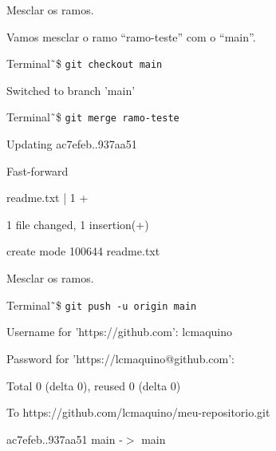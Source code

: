 \documentclass[brazil,aspectratio=169]{beamer}
\newcommand{\terminal}[1]{\textcolor{my-green}{\texttt{#1}}}
\begin{document}
\begin{frame}{Mesclar os ramos.}

  Vamos mesclar o ramo ``ramo-teste'' com o ``main''.

  \begin{exampleblock}{Terminal}
    \~\,\$ \terminal{git checkout main}

    Switched to branch 'main'
  \end{exampleblock}


  \begin{exampleblock}{Terminal}
    \~\,\$ \terminal{git merge ramo-teste}

    Updating ac7efeb..937aa51

    Fast-forward

    readme.txt | 1 +

    1 file changed, 1 insertion(+)

    create mode 100644 readme.txt
 
  \end{exampleblock}

\end{frame}


\begin{frame}{Mesclar os ramos.}

  \begin{exampleblock}{Terminal}
    \~\,\$ \terminal{git push -u origin main}

    Username for 'https://github.com': lcmaquino

    Password for 'https://lcmaquino@github.com':

    Total 0 (delta 0), reused 0 (delta 0)

    To https://github.com/lcmaquino/meu-repositorio.git

    ac7efeb..937aa51  main -$>$ main
 
  \end{exampleblock}
\end{frame}
\end{document}
